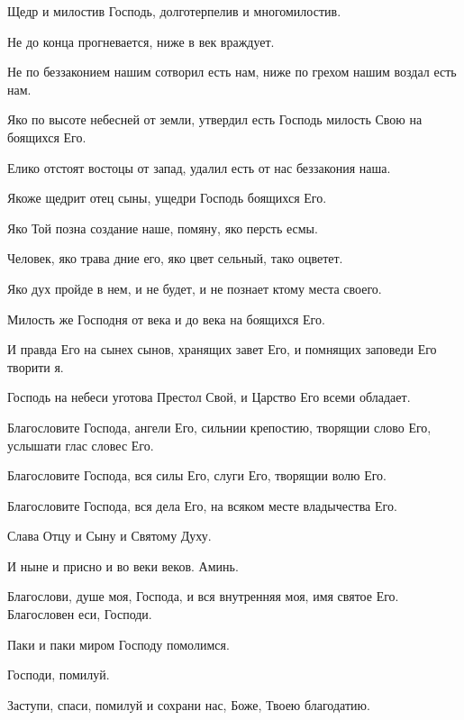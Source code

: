 \begin{mymulticols}
 Щедр и милостив Господь, долготерпелив и многомилостив.

 Не до конца прогневается, ниже в век враждует. 

 Не по беззаконием нашим сотворил есть нам, ниже по грехом нашим воздал есть нам. 

 Яко по высоте небесней от земли,  утвердил есть Господь милость Свою на боящихся Его. 

 Елико отстоят востоцы от запад,  удалил есть от нас беззакония наша. 

 Якоже щедрит отец сыны, ущедри Господь боящихся Его. 

 Яко Той позна создание наше, помяну, яко персть есмы. 

 Человек, яко трава дние его, яко цвет сельный, тако оцветет. 

 Яко дух пройде в нем, и не будет, и не познает ктому места своего. 

 Милость же Господня от века и до века на боящихся Его. 

 И правда Его на сынех сынов, хранящих завет Его, и помнящих заповеди Его творити я. 

 Господь на небеси уготова Престол Свой, и Царство Его всеми обладает. 

 Благословите Господа, ангели Его,  сильнии крепостию, творящии слово Его, услышати глас словес Его. 

 Благословите Господа, вся силы Его, слуги Его, творящии волю Его. 

 Благословите Господа, вся дела Его, на всяком месте владычества Его. 

 Слава Отцу и Сыну и Святому Духу. 

 И ныне и присно и во веки веков. Аминь. 

 Благослови, душе моя, Господа, и вся внутренняя моя, имя святое Его. Благословен еси, Господи.


 Паки и паки миром Господу помолимся. 

 Господи, помилуй. 

 Заступи, спаси, помилуй и сохрани нас, Боже, Твоею благодатию. 


\end{mymulticols}
